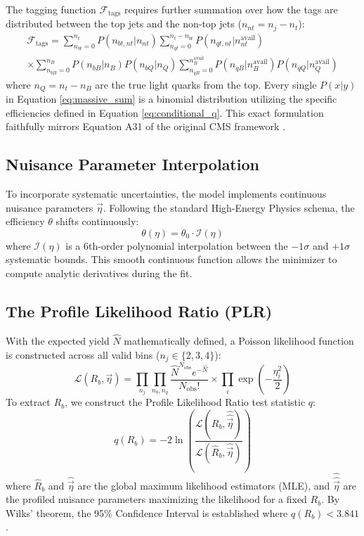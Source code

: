 \documentclass[11pt,a4paper]{article}
\begin{document}
The tagging function $\mathcal{F}_{\text{tags}}$ requires further summation over how the tags are distributed between the top jets and the non-top jets ($n_{nt} = n_j - n_t$):
\begin{align}
\mathcal{F}_{\text{tags}} = \sum_{n_{bt}=0}^{n_t} P(n_{bt,nt} | n_{nt}) \sum_{n_{qt}=0}^{n_t - n_{bt}} P(n_{qt,nt} | n_{nt}^{\text{avail}}) \nonumber \\ 
\times \sum_{n_{bB}=0}^{n_B} P(n_{bB}|n_B) P(n_{bQ}|n_Q) \sum_{n_{qB}=0}^{n_B^{\text{avail}}} P(n_{qB}|n_B^{\text{avail}}) P(n_{qQ}|n_Q^{\text{avail}}) \label{eq:massive_sum}
\end{align}
where $n_Q = n_t - n_B$ are the true light quarks from the top. Every single $P(x|y)$ in Equation \ref{eq:massive_sum} is a binomial distribution utilizing the specific efficiencies defined in Equation \ref{eq:conditional_q}. This exact formulation faithfully mirrors Equation A31 of the original CMS framework \cite{cms_paper}.

\subsection{Nuisance Parameter Interpolation}
To incorporate systematic uncertainties, the model implements continuous nuisance parameters $\vec{\eta}$. Following the standard High-Energy Physics schema, the efficiency $\theta$ shifts continuously:
\begin{equation}
\theta(\eta) = \theta_0 \cdot \mathcal{I}(\eta)
\end{equation}
where $\mathcal{I}(\eta)$ is a 6th-order polynomial interpolation between the $-1\sigma$ and $+1\sigma$ systematic bounds. This smooth continuous function allows the minimizer to compute analytic derivatives during the fit.

\subsection{The Profile Likelihood Ratio (PLR)}
With the expected yield $\hat{N}$ mathematically defined, a Poisson likelihood function is constructed across all valid bins ($n_j \in \{2,3,4\}$):
\begin{equation}
\mathcal{L}(R_b, \vec{\eta}) = \prod_{n_j} \prod_{n_b, n_q} \frac{\hat{N}^{N_{\text{obs}}} e^{-\hat{N}}}{N_{\text{obs}}!} \times \prod_{i} \exp\left(-\frac{\eta_i^2}{2}\right)
\end{equation}
To extract $R_b$, we construct the Profile Likelihood Ratio test statistic $q$:
\begin{equation}
q(R_b) = -2 \ln \left( \frac{\mathcal{L}(R_b, \hat{\hat{\vec{\eta}}})}{\mathcal{L}(\hat{R}_b, \hat{\vec{\eta}})} \right)
\end{equation}
where $\hat{R}_b$ and $\hat{\vec{\eta}}$ are the global maximum likelihood estimators (MLE), and $\hat{\hat{\vec{\eta}}}$ are the profiled nuisance parameters maximizing the likelihood for a fixed $R_b$. By Wilks' theorem, the 95\% Confidence Interval is established where $q(R_b) < 3.841$.
\end{document}
